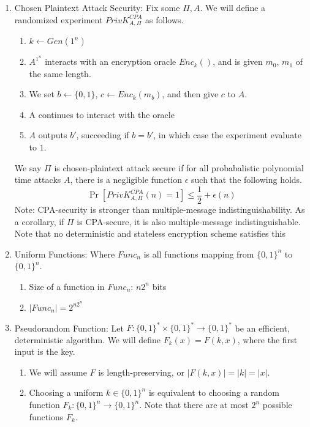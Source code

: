 \documentclass[12pt,letterpaper]{article}
\begin{document}
\begin{enumerate}
        \item Chosen Plaintext Attack Security: Fix some $\Pi, A$. We will define a randomized experiment $PrivK^{CPA}_{A,\Pi}$ as follows.
        \begin{enumerate}
            \item $k\leftarrow Gen(1^n)$
            \item $A^{1^n}$ interacts with an encryption oracle $Enc_k()$, and is given $m_0$, $m_1$ of the same length. 
            \item We set $b\leftarrow\{0,1\}$, $c\leftarrow Enc_k(m_b)$, and then give $c$ to $A$.
            \item A continues to interact with the oracle
            \item $A$ outputs $b'$, succeeding if $b=b'$, in which case the experiment evaluate to $1$.
        \end{enumerate}
        We say $\Pi$ is chosen-plaintext attack secure if for all probabalistic polynomial time attacks $A$, there is a negligible function $\epsilon$ such that the following holds.
        \[\Pr[PrivK^{CPA}_{A,\Pi}(n)=1]\leq\frac{1}{2}+\epsilon(n)\]
    Note: CPA-security is stronger than multiple-message indistinguishability. As a corollary, if $\Pi$ is CPA-secure, it is also multiple-message indistinguishable.\bigskip\newline
    Note that no deterministic and stateless encryption scheme satisfies this
    \newline
    \item Uniform Functions: Where $Func_n$ is all functions mapping from $\{0,1\}^n$ to $\{0,1\}^n$.
        \begin{enumerate}
            \item Size of a function in $Func_n$: $n2^n$ bits
            \item $|Func_n|=2^{n2^n}$
        \end{enumerate}\newpage
    \item Pseudorandom Function: Let $F:\{0,1\}^*\times\{0,1\}^*\rightarrow\{0,1\}^*$ be an efficient, deterministic algorithm. We will define $F_k(x)=F(k,x)$, where the first input is the key.
        \begin{enumerate}
            \item We will assume $F$ is length-preserving, or $|F(k,x)|=|k|=|x|$.
            \item Choosing a uniform $k\in\{0,1\}^n$ is equivalent to choosing a random function $F_k:\{0,1\}^n\rightarrow\{0,1\}^n$. Note that there are at most $2^n$ possible functions $F_k$.\bigskip\newline

\end{enumerate}
\end{enumerate}
\end{document}
